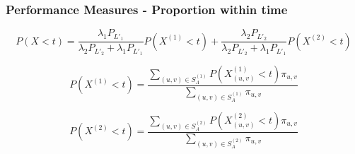 \begin{frame}
    \frametitle{Performance Measures - Proportion within time}
    \centering
    
    \small
    \begin{equation*}
        P(X < t) = \frac{\lambda_1 P_{L'_1}}{\lambda_2 P_{L'_2}+\lambda_1 P_{L'_1}} 
        P(X^{(1)} < t) + \frac{\lambda_2 P_{L'_2}}{\lambda_2 P_{L'_2} + 
        \lambda_1 P_{L'_1}}P(X^{(2)} < t) 
    \end{equation*}

    \begin{equation*}
        P(X^{(1)} < t) = \frac{\sum_{(u,v) \in S_A^{(1)}} P(X_{(u,v)}^{(1)} < t) 
        \pi_{u,v} }{\sum_{(u,v) \in S_A^{(1)}} \pi_{u,v}}
    \end{equation*}
    
    
    \begin{equation*}
        P(X^{(2)} < t) = \frac{\sum_{(u,v) \in S_A^{(2)}} P(X_{(u,v)}^{(2)} < t) 
        \pi_{u,v} }{\sum_{(u,v) \in S_A^{(2)}} \pi_{u,v}}
    \end{equation*}
    
\end{frame}


